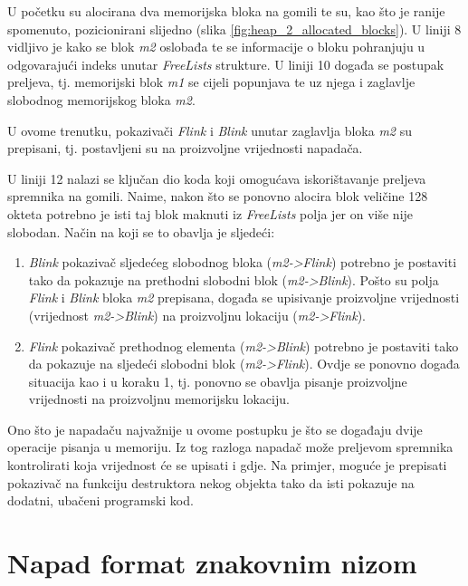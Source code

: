 \documentclass[times, utf8, diplomski, numeric]{fer}
\begin{document}
U početku su alocirana dva memorijska bloka na gomili te su, kao
što je ranije spomenuto, pozicionirani slijedno 
(slika \ref{fig:heap_2_allocated_blocks}). U liniji 8 vidljivo je kako			%
se blok \emph{m2} oslobađa te se informacije o bloku pohranjuju u
odgovarajući indeks unutar \emph{FreeLists} strukture.	U liniji			%
10 događa se postupak preljeva, tj. memorijski blok \emph{m1} se
cijeli popunjava te uz njega i zaglavlje slobodnog memorijskog
bloka \emph{m2}.

U ovome trenutku, pokazivači \emph{Flink} i \emph{Blink} unutar
zaglavlja bloka \emph{m2} su prepisani, tj. postavljeni su na
proizvoljne vrijednosti napadača.

U liniji 12 nalazi se ključan dio koda koji omogućava
iskorištavanje preljeva spremnika na gomili. Naime, nakon što se
ponovno alocira blok veličine 128 okteta potrebno je isti taj
blok maknuti iz \emph{FreeLists} polja jer on više nije slobodan.
Način na koji se to obavlja je sljedeći:

\begin{enumerate}

\item \emph{Blink} pokazivač sljedećeg slobodnog bloka 
(\emph{m2->Flink}) potrebno je postaviti tako da pokazuje na
prethodni slobodni blok (\emph{m2->Blink}). Pošto su polja
\emph{Flink} i \emph{Blink} bloka \emph{m2} prepisana, događa se
upisivanje proizvoljne vrijednosti (vrijednost \emph{m2->Blink})
na proizvoljnu lokaciju (\emph{m2->Flink}).

\item \emph{Flink} pokazivač prethodnog elementa 
(\emph{m2->Blink}) potrebno je postaviti tako da pokazuje na
sljedeći slobodni blok (\emph{m2->Flink}). Ovdje se ponovno
događa situacija kao i u koraku 1, tj. ponovno se obavlja pisanje
proizvoljne vrijednosti na proizvoljnu memorijsku lokaciju.

\end{enumerate}

Ono što je napadaču najvažnije u ovome postupku je što se
događaju dvije operacije pisanja u memoriju. Iz tog razloga
napadač može preljevom spremnika kontrolirati koja vrijednost će
se upisati i gdje. Na primjer, moguće je prepisati pokazivač na
funkciju destruktora nekog objekta tako da isti pokazuje na
dodatni, ubačeni programski kod.

\section{Napad format znakovnim nizom}
\end{document}
